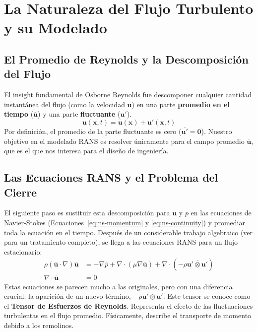 \section{La Naturaleza del Flujo Turbulento y su Modelado}
\label{sec:turbulence-theory}

\subsection{El Promedio de Reynolds y la Descomposición del Flujo}
El insight fundamental de Osborne Reynolds fue descomponer cualquier cantidad instantánea del flujo (como la velocidad \(\bm{u}\)) en una parte \textbf{promedio en el tiempo} (\(\overline{\bm{u}}\)) y una parte \textbf{fluctuante} (\(\bm{u}'\)).
\begin{equation}
    \bm{u}(\bm{x}, t) = \overline{\bm{u}}(\bm{x}) + \bm{u}'(\bm{x}, t)
    \label{eq:reynolds-decomposition}
\end{equation}
Por definición, el promedio de la parte fluctuante es cero (\(\overline{\bm{u}'} = \bm{0}\)). Nuestro objetivo en el modelado RANS es resolver únicamente para el campo promedio \(\overline{\bm{u}}\), que es el que nos interesa para el diseño de ingeniería.

\subsection{Las Ecuaciones RANS y el Problema del Cierre}
El siguiente paso es sustituir esta descomposición para \(\bm{u}\) y \(p\) en las ecuaciones de Navier-Stokes (Ecuaciones~\eqref{eq:ns-momentum} y \eqref{eq:ns-continuity}) y promediar toda la ecuación en el tiempo. Después de un considerable trabajo algebraico (ver \cite{Pope2000} para un tratamiento completo), se llega a las ecuaciones RANS para un flujo estacionario:
\begin{align}
    \rho(\overline{\bm{u}} \cdot \nabla)\overline{\bm{u}} &= -\nabla \overline{p} + \nabla \cdot (\mu \nabla\overline{\bm{u}}) + \nabla \cdot (-\rho \overline{\bm{u}' \otimes \bm{u}'}) \label{eq:rans-momentum} \\
    \nabla \cdot \overline{\bm{u}} &= 0 \label{eq:rans-continuity}
\end{align}
Estas ecuaciones se parecen mucho a las originales, pero con una diferencia crucial: la aparición de un nuevo término, \(-\rho \overline{\bm{u}' \otimes \bm{u}'}\). Este tensor se conoce como el \textbf{Tensor de Esfuerzos de Reynolds}. Representa el efecto de las fluctuaciones turbulentas en el flujo promedio. Físicamente, describe el transporte de momento debido a los remolinos.

